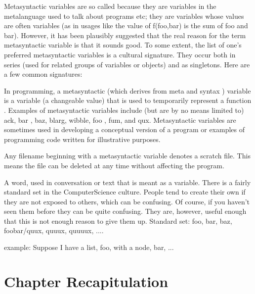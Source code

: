 \documentclass[thesis-solanki.tex]{subfiles}
\begin{document}
Metasyntactic variables are so called because they are variables in the metalanguage used to talk about programs
etc; they are variables whose values are often variables (as in usages like the value of f(foo,bar) is
the sum of foo and bar).
However, it has been plausibly suggested that the real reason for the term metasyntactic
variable is that it sounds good.
To some extent, the list of one's preferred metasyntactic variables is a cultural signature.
They occur both in series (used for related groups of variables or objects) and as singletons.
Here are a few common signatures:


\cite{webiste:metasyntacticvariableswhatistectarget}
In programming, a metasyntactic (which derives from meta and syntax ) variable is a variable (a changeable value) that is used to temporarily represent a function . Examples of metasyntactic variables include (but are by no means limited to) ack, bar , baz, blarg, wibble, foo , fum, and qux. Metasyntactic variables are sometimes used in developing a conceptual version of a program or examples of programming code written for illustrative purposes.

Any filename beginning with a metasyntactic variable denotes a scratch file. This means the file can be deleted at any time without affecting the program.



\cite{webste:metasyntacticvariablesc2wiki}

A word, used in conversation or text that is meant as a variable. There is a fairly standard set in the ComputerScience culture. People tend to create their own if they are not exposed to others, which can be confusing. Of course, if you haven't seen them before they can be quite confusing. They are, however, useful enough that this is not enough reason to give them up.
Standard set: foo, bar, baz, foobar/quux, quuux, quuuux, ....

example: Suppose I have a list, foo, with a node, bar, ...


\section{Chapter Recapitulation}

\ifMain
\begin{scope}
  \nolinenumbers
  \enotesize
  \par
  \begin{singlespace}
  \setlength{\parskip}{12pt plus 2pt minus 1pt}
  \theendnotes
  \par
  \end{singlespace}
\end{scope}
\fi
\end{document}
